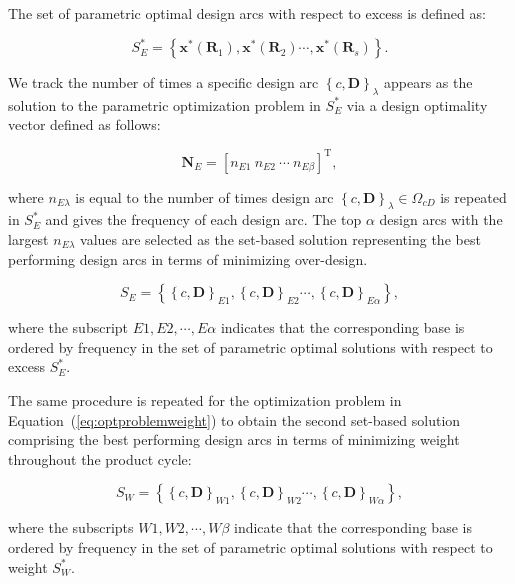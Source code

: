 The set of parametric optimal design arcs with respect to excess is defined as:

\begin{equation} \label{eq:SBDexcessopt}
	S_E^* = \left\{\mathbf{x}^*(\mathbf{R}_1),\mathbf{x}^*(\mathbf{R}_2)\cdots,\mathbf{x}^*(\mathbf{R}_s)\right\}.
\end{equation}

We track the number of times a specific design arc $\left\{c,\mathbf{D}\right\}_\lambda$ appears as the solution to the parametric optimization problem in $S_E^*$ via a design optimality vector defined as follows:

\begin{equation} \label{eq:robustnessvec}
	\mathbf{N}_E = \left[n_{E1} ~ n_{E2} ~ \cdots ~ n_{E\beta}\right]^{\mathrm{T}},
\end{equation}

where $n_{E\lambda}$ is equal to the number of times design arc $\left\{c,\mathbf{D}\right\}_\lambda \in \Omega_{cD}$ is repeated in $S_E^*$ and gives the frequency of each design arc. The top $\alpha$ design arcs with the largest $n_{E\lambda}$ values are selected as the set-based solution representing the best performing design arcs in terms of minimizing over-design.

\begin{equation} \label{eq:SBDexcess}
	S_E = \left\{\left\{c,\mathbf{D}\right\}_{E1},\left\{c,\mathbf{D}\right\}_{E2}\cdots,\left\{c,\mathbf{D}\right\}_{E\alpha}\right\},
\end{equation}

where the subscript $E1,E2,\cdots,E\alpha$ indicates that the corresponding base is ordered by frequency in the set of parametric optimal solutions with respect to excess $S_E^*$.

The same procedure is repeated for the optimization problem in Equation~(\ref{eq:optproblemweight}) to obtain the second set-based solution comprising the best performing design arcs in terms of minimizing weight throughout the product cycle:

\begin{equation} \label{eq:SBDexcess}
	S_W = \left\{\left\{c,\mathbf{D}\right\}_{W1},\left\{c,\mathbf{D}\right\}_{W2}\cdots,\left\{c,\mathbf{D}\right\}_{W\alpha}\right\},
\end{equation}

where the subscripts $W1,W2,\cdots,W\beta$ indicate that the corresponding base is ordered by frequency in the set of parametric optimal solutions with respect to weight $S_W^*$.

